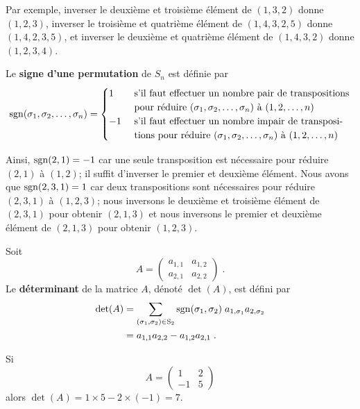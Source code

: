 {Par exemple, inverser le deuxième et troisième élément de $(1,3,2)$
donne $(1,2,3)$, inverser le troisième et quatrième élément de
$(1,4,3,2,5)$ donne $(1,4,2,3,5)$, et inverser le deuxième et
quatrième élément de $(1,4,3,2)$ donne $(1,2,3,4)$.

\begin{focus}{\dfn}
Le {\bfseries signe d'une permutation} de $S_{n}$ est définie par
\[
\operatorname{sgn} (\sigma_1, \sigma_2, \ldots, \sigma_n) =
\begin{cases}
1 & \ \text{s'il faut effectuer un nombre pair de transpositions}\\
& \ \text{pour réduire }(\sigma_1, \sigma_2, \ldots, \sigma_n)\text{ à }
(1,2,\ldots, n) \\
-1 & \ \text{s'il faut effectuer un nombre impair de transposi-}\\
&\ \text{tions pour réduire }(\sigma_1, \sigma_2, \ldots, \sigma_n)\text{ à }
(1,2,\ldots, n)
\end{cases}
\]
\end{focus}

Ainsi, $\operatorname{sgn} (2,1) = -1$ car une seule transposition est nécessaire
pour réduire $(2,1)$ à $(1,2)$; il suffit d'inverser le premier et
deuxième élément.  Nous avons que $\operatorname{sgn} (2,3,1)=1$ car deux transpositions
sont nécessaires pour réduire $(2,3,1)$ à $(1,2,3)$; nous inversons le
deuxième et troisième élément de $(2,3,1)$ pour obtenir $(2,1,3)$ et
nous inversons le premier et deuxième élément de $(2,1,3)$ pour obtenir
$(1,2,3)$.

\begin{focus}{\dfn} 
Soit
\[
A = \begin{pmatrix} a_{1,1} & a_{1,2} \\ a_{2,1} & a_{2,2} \end{pmatrix} \; .
\]
Le {\bfseries déterminant} de la matrice $A$, dénoté $\det(A)$, est
défini par
\begin{align*}
\det(A) &= \sum_{(\sigma_1,\sigma_2) \in \mathrm{S}_{2}} \operatorname{sgn} (\sigma_1,\sigma_2) \;
a_{1,\sigma_1} a_{2,\sigma_2} \\
&= a_{1,1}a_{2,2} - a_{1,2}a_{2,1} \; .
\end{align*}
\end{focus}

\begin{egg}
Si
\[
A= \begin{pmatrix} 1 & 2 \\ -1 & 5 \end{pmatrix}
\]
alors $\det(A) = 1\times 5 - 2 \times (-1) = 7$.
\end{egg}

}
